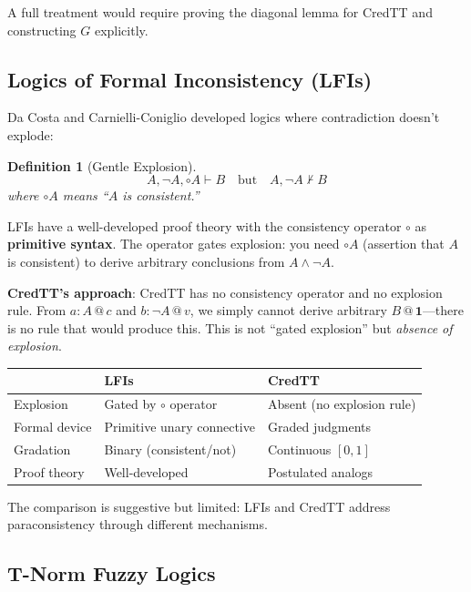 \documentclass[11pt,a4paper]{article}
\makeatletter
\newtheorem{definition}{Definition}[section]
\newcommand{\at}[1]{\,@\,#1}
\newcommand{\one}{\mathbf{1}}
\makeatother
\begin{document}
A full treatment would require proving the diagonal lemma for CredTT and constructing $G$ explicitly.

\subsection{Logics of Formal Inconsistency (LFIs)}

Da Costa \citep{dacosta1974paraconsistent} and Carnielli-Coniglio \citep{carnielli2016paraconsistent} developed logics where contradiction doesn't explode:

\begin{definition}[Gentle Explosion]
\[
A, \neg A, \circ A \vdash B \quad \text{but} \quad A, \neg A \not\vdash B
\]
where $\circ A$ means ``$A$ is consistent.''
\end{definition}

LFIs have a well-developed proof theory with the consistency operator $\circ$ as \textbf{primitive syntax}. The operator gates explosion: you need $\circ A$ (assertion that $A$ is consistent) to derive arbitrary conclusions from $A \land \neg A$.

\textbf{CredTT's approach}: CredTT has no consistency operator and no explosion rule. From $a : A \at{c}$ and $b : \neg A \at{v}$, we simply cannot derive arbitrary $B \at{\one}$---there is no rule that would produce this. This is not ``gated explosion'' but \emph{absence of explosion}.

\begin{center}
\begin{tabular}{l|l|l}
& \textbf{LFIs} & \textbf{CredTT} \\
\hline
Explosion & Gated by $\circ$ operator & Absent (no explosion rule) \\
Formal device & Primitive unary connective & Graded judgments \\
Gradation & Binary (consistent/not) & Continuous $[0,1]$ \\
Proof theory & Well-developed & Postulated analogs \\
\end{tabular}
\end{center}

The comparison is suggestive but limited: LFIs and CredTT address paraconsistency through different mechanisms.

\subsection{T-Norm Fuzzy Logics}
\end{document}
